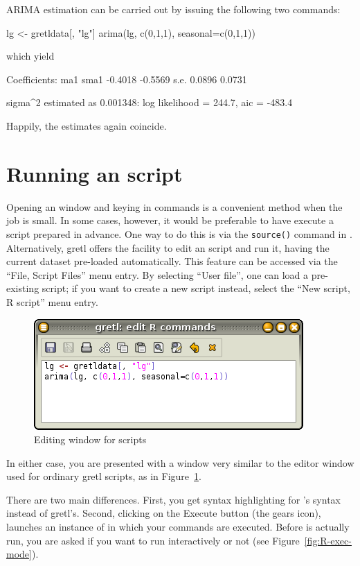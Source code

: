 ARIMA estimation can be carried out by issuing the following two
 commands:
\begin{code}
lg <- gretldata[, "lg"]
arima(lg, c(0,1,1), seasonal=c(0,1,1))
\end{code}

which yield

\begin{code}
Coefficients:
          ma1     sma1
      -0.4018  -0.5569
s.e.   0.0896   0.0731

sigma^2 estimated as 0.001348:  log likelihood = 244.7,  aic = -483.4
\end{code}

Happily, the estimates again coincide.

\section{Running an  script}
\label{sec:R-scripts}

Opening an  window and keying in commands is a convenient
method when the job is small. In some cases, however, it would be
preferable to have  execute a script prepared in advance. 
One way to do this is via the \texttt{source()} command in
.  Alternatively, gretl offers the facility to edit an
 script and run it, having the current dataset pre-loaded
automatically. This feature can be accessed via the ``File, Script
Files'' menu entry.  By selecting ``User file'', one can load a
pre-existing  script; if you want to create a new script
instead, select the ``New script, R script'' menu entry.

\begin{figure}[htbp]
  \centering
  \includegraphics[scale=0.7]{figures/R-edit1}
  \caption{Editing window for  scripts}
  \label{fig:R-edit1}
\end{figure}
In either case, you are presented with a window very similar to
the editor window used for ordinary gretl scripts, as in
Figure~\ref{fig:R-edit1}.

There are two main differences.  First, you get syntax highlighting for
's syntax instead of gretl's. Second, clicking on the
Execute button (the gears icon), launches an instance of  in
which your commands are executed.  Before  is actually run, you
are asked if you want to run  interactively or not (see
Figure~\ref{fig:R-exec-mode}).

